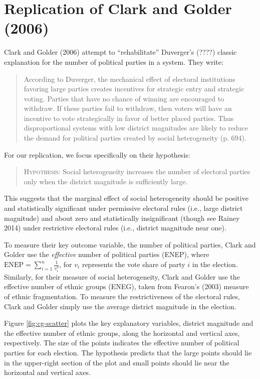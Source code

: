 \documentclass[12pt]{article}
\begin{document}
\section*{Replication of Clark and Golder (2006)}

Clark and Golder (2006) attempt to ``rehabilitate'' Duverger's (????) classic explanation for the number of political parties in a system.
They write: 

\begin{quote}
According to Duverger, the mechanical effect of electoral institutions favoring large parties creates incentives for strategic entry and strategic voting. 
Parties that have no chance of winning are encouraged to withdraw. 
If these parties fail to withdraw, then voters will have an incentive to vote strategically in favor of better placed parties. 
Thus disproportional systems with low district magnitudes are likely to reduce the demand for political parties created by social heterogeneity (p. 694).
\end{quote}

For our replication, we focus specifically on their hypothesis:
\begin{quote}
\textsc{Hypothesis:} Social heterogeneity increases the number of electoral parties only when the district magnitude is sufficiently large.
\end{quote}

This suggests that the marginal effect of social heterogeneity should be positive and statistically significant under permissive electoral rules (i.e., large district magnitude) and about zero and statistically insignificant (though see Rainey 2014) under restrictive electoral rules (i.e., district magnitude near one).

To measure their key outcome variable, the number of political parties, Clark and Golder use the \textit{effective} number of political parties (ENEP), where $\text{ENEP} = \sum_{i = 1}^n\frac{1}{v_i^2}$, for $v_i$ represents the vote share of party $i$ in the election. 
Similarly, for their measure of social heterogeneity, Clark and Golder use the effective number of ethnic groups (ENEG), taken from Fearon's (2003) measure of ethnic fragmentation. 
To measure the restrictiveness of the electoral rules, Clark and Golder simply use the average district magnitude in the election. 

Figure \ref{fig:cg-scatter} plots the key explanatory variables, district magnitude and the effective number of ethnic groups, along the horizontal and vertical axes, respectively. 
The size of the points indicates the effective number of political parties for each election. 
The hypothesis predicts that the large points should lie in the upper-right section of the plot and small points should lie near the horizontal and vertical axes.
\end{document}
